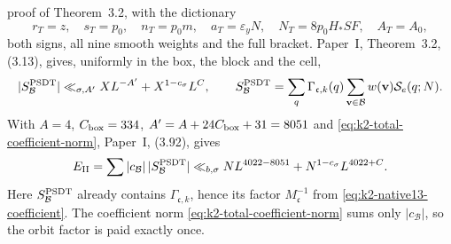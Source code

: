 proof of Theorem~3.2, with the dictionary
\begin{equation}\label{eq:k2-theorem-28-dictionary}
 r_T=z,\quad s_T=p_0,\quad n_T=p_0m,\quad a_T=\varepsilon_yN,
 \quad N_T=8p_0H_*SF,\quad A_T=A_0,
\end{equation}
both signs, all nine smooth weights and the full bracket.
Paper~I, Theorem~3.2, (3.13), gives, uniformly in the box, the block and
the cell,
\begin{equation}\label{eq:k2-med-per-box}
 |S_{\mathcal B}^{\rm PSDT}|
 \ll_{\sigma,A'}XL^{-A'}+X^{1-c_\sigma}L^C,\qquad
 S_{\mathcal B}^{\rm PSDT}=\sum_q\Gamma_{\mathfrak c,k}(q)
 \sum_{\mathbf v\in\mathcal B}w(\mathbf v)\mathcal S_{e}(q;N).
\end{equation}
With \(A=4\), \(C_{\rm box}=334\), \(A'=A+24C_{\rm box}+31=8051\) and
\eqref{eq:k2-total-coefficient-norm}, Paper~I, (3.92), gives
\begin{equation}\label{eq:k2-med-aggregate}
 E_{\rm II}=\sum|c_{\mathcal B}|\,|S_{\mathcal B}^{\rm PSDT}|
 \ll_{b,\sigma}NL^{4022-8051}+N^{1-c_\sigma}L^{4022+C}.
\end{equation}
Here \(S_{\mathcal B}^{\rm PSDT}\) already contains
\(\Gamma_{\mathfrak c,k}\), hence its factor
\(M_{\mathfrak c}^{-1}\) from \eqref{eq:k2-native13-coefficient}. The
coefficient norm \eqref{eq:k2-total-coefficient-norm} sums only
\(|c_{\mathcal B}|\), so the orbit factor is paid exactly once.

